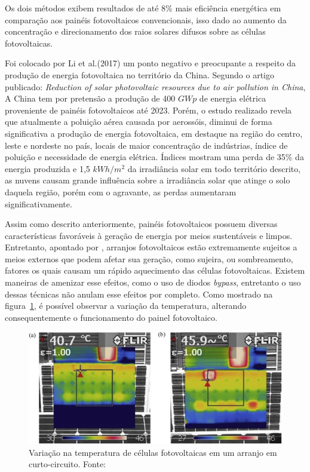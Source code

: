 Os dois métodos exibem resultados de até 8\% mais eficiência energética em comparação aos painéis fotovoltaicos convencionais, isso dado ao aumento da concentração e direcionamento dos raios solares difusos sobre as células fotovoltaicas.

Foi colocado por Li et al.(2017) um ponto negativo e preocupante a respeito da produção de energia fotovoltaica no território da China. Segundo o artigo publicado: \textit{Reduction of solar photovoltaic resources due to air pollution in China}, A China tem por pretensão a produção de 400 $GWp$ de energia elétrica proveniente de painéis fotovoltaicos até 2023. Porém, o estudo realizado revela que atualmente a poluição aérea causada por aerossóis, diminui de forma significativa a produção de energia fotovoltaica, em destaque na região do centro, leste e nordeste no país, locais de maior concentração de indústrias, índice de poluição e necessidade de energia elétrica. Índices mostram uma perda de 35\% da energia produzida e 1,5 $kWh/m^2$ da irradiância solar em todo território descrito, as nuvens causam grande influência sobre a irradiância solar que atinge o solo daquela região, porém com o agravante, as perdas aumentaram significativamente.

Assim como descrito anteriormente, painéis fotovoltaicos possuem diversas características favoráveis à geração de energia por meios sustentáveis e limpos. Entretanto, apontado por , arranjos fotovoltaicos estão extremamente sujeitos a meios externos que podem afetar sua geração, como sujeira, ou sombreamento, fatores os quais causam um rápido aquecimento das células fotovoltaicas. Existem maneiras de amenizar esse efeitos, como o uso de diodos \textit{bypass}, entretanto o uso dessas técnicas não anulam esse efeitos por completo. Como mostrado na figura~\ref{fig:Temp}, é possível observar a variação da temperatura, alterando consequentemente o funcionamento do painel fotovoltaico.

\FloatBarrier
\begin{figure}[htbp]
	\centering
	\includegraphics[scale=1.3]{imagens/Temp_BRESSAN}
	\caption{Variação na temperatura de células fotovoltaicas em um arranjo em curto-circuito. Fonte:   }
	
	\label{fig:Temp}
\end{figure}
\FloatBarrier

